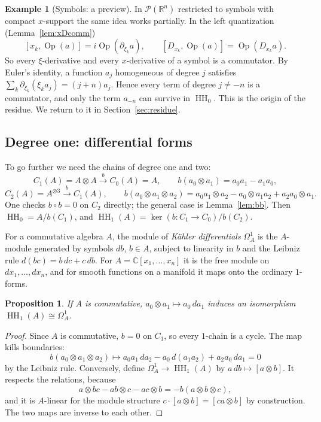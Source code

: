 \documentclass[11pt,oneside,reqno]{article}
\DeclareMathOperator{\HH}{HH}
\DeclareMathOperator{\Op}{Op}
\newcommand{\C}{\mathbb C}
\newcommand{\R}{\mathbb R}
\newcommand{\cP}{\mathcal P}
\newcommand{\Om}{\Omega}
\newcommand{\pa}{\partial}
\theoremstyle{plain}
\newtheorem{proposition}[theorem]{Proposition}
\theoremstyle{definition}
\newtheorem{example}[theorem]{Example}
\theoremstyle{remark}
\begin{document}
\begin{example}[Symbols: a preview]\label{ex:symbolpreview}
In \(\cP(\R^n)\) restricted to symbols with compact \(x\)-support the same
idea works partially. In the left quantization (Lemma~\ref{lem:xDcomm})
\[
 [x_k,\Op(a)]=i\Op(\pa_{\xi_k}a),\qquad [D_{x_k},\Op(a)]=\Op(D_{x_k}a).
\]
So every \(\xi\)-derivative and every \(x\)-derivative of a symbol is a
commutator. By Euler's identity, a function \(a_j\) homogeneous of degree
\(j\) satisfies \(\sum_k\pa_{\xi_k}(\xi_ka_j)=(j+n)a_j\). Hence every term
of degree \(j\ne-n\) is a commutator, and only the term \(a_{-n}\) can
survive in \(\HH_0\). This is the origin of the residue. We return to it
in Section~\ref{sec:residue}.
\end{example}

\subsection{Degree one: differential forms}\label{subsec:HH1}
To go further we need the chains of degree one and two:
\[
 C_1(A)=A\otimes A\xrightarrow{\;b\;}C_0(A)=A,\qquad b(a_0\otimes a_1)=a_0a_1-a_1a_0,
\]
\[
 C_2(A)=A^{\otimes3}\xrightarrow{\;b\;}C_1(A),\qquad
 b(a_0\otimes a_1\otimes a_2)=a_0a_1\otimes a_2-a_0\otimes a_1a_2+a_2a_0\otimes a_1 .
\]
One checks \(b\circ b=0\) on \(C_2\) directly; the general case is
Lemma~\ref{lem:bb}. Then \(\HH_0=A/b(C_1)\), and
\(\HH_1(A)=\ker(b:C_1\to C_0)/b(C_2)\).

For a commutative algebra \(A\), the module of \emph{Kähler differentials}
\(\Om^1_A\) is the \(A\)-module generated by symbols \(db\), \(b\in A\),
subject to linearity in \(b\) and the Leibniz rule \(d(bc)=b\,dc+c\,db\).
For \(A=\C[x_1,\dots,x_n]\) it is the free module on \(dx_1,\dots,dx_n\),
and for smooth functions on a manifold it maps onto the ordinary
\(1\)-forms.

\begin{proposition}\label{prop:HH1}
If \(A\) is commutative, \(a_0\otimes a_1\mapsto a_0\,da_1\) induces an
isomorphism \(\HH_1(A)\cong\Om^1_A\).
\end{proposition}

\begin{proof}
Since \(A\) is commutative, \(b=0\) on \(C_1\), so every \(1\)-chain is a
cycle. The map kills boundaries:
\[
 b(a_0\otimes a_1\otimes a_2)\mapsto a_0a_1\,da_2-a_0\,d(a_1a_2)+a_2a_0\,da_1=0
\]
by the Leibniz rule. Conversely, define \(\Om^1_A\to\HH_1(A)\) by
\(a\,db\mapsto[a\otimes b]\). It respects the relations, because
\[
 a\otimes bc-ab\otimes c-ac\otimes b=-b(a\otimes b\otimes c),
\]
and it is \(A\)-linear for the module structure \(c\cdot[a\otimes b]=[ca\otimes b]\)
by construction. The two maps are inverse to each other.
\end{proof}
\end{document}
